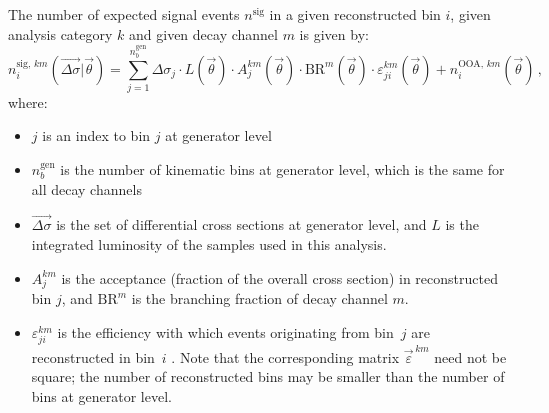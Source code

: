 The number of expected signal events $n^\text{sig}$ in a given reconstructed bin $i$, given analysis category $k$ and given decay channel $m$ is given by:
% 
\begin{equation}
n_i^{\text{sig},\,km}(\vec{\Delta\sigma} | \vec{\theta})
= \sum_{j=1}^{n_b^\text{gen}}
    \Delta\sigma_j \cdot L(\vec{\theta})
    \cdot A_j^{km}(\vec{\theta}) \cdot \text{BR}^{m}(\vec{\theta})
    \cdot \varepsilon_{ji}^{km}(\vec{\theta})
    + n^{\text{OOA},\,km}_i(\vec{\theta})
\,,
\label{eq:nsig}
\end{equation}
% 
where:
% 
\begin{itemize}
\item $j$ is an index to bin $j$ at generator level
% 
\item $n_b^\text{gen}$ is the number of kinematic bins at generator level, which is the same for all decay channels
% 
% 
% 
% 
% 
\item $\vec{\Delta\sigma}$ is the set of differential cross sections at generator level, and $L$ is the integrated luminosity of the samples used in this analysis.
% 
\item $A_j^{km}$ is the acceptance (fraction of the overall cross section) in reconstructed bin $j$, and $\text{BR}^m$ is the branching fraction of decay channel $m$.
% 
\item $\varepsilon_{ji}^{km}$ is the efficiency with which events originating from bin~$j$ are reconstructed in bin~$i$%
.
Note that the corresponding matrix $\vec{\varepsilon}^{\,km}$ need not be square; the number of reconstructed bins may be smaller than the number of bins at generator level.

\end{itemize}
